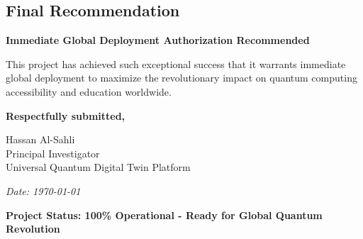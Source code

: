 \documentclass[12pt,a4paper]{article}
\begin{document}
\subsection{Final Recommendation}

\textbf{Immediate Global Deployment Authorization Recommended}

This project has achieved such exceptional success that it warrants immediate global deployment to maximize the revolutionary impact on quantum computing accessibility and education worldwide.

\vspace{1cm}

\textbf{Respectfully submitted,}

\vspace{0.5cm}

Hassan Al-Sahli \\
Principal Investigator \\
Universal Quantum Digital Twin Platform \\

\vspace{0.5cm}

\textit{Date: \today}

\vspace{0.5cm}

\textcolor{quantumblue}{\textbf{Project Status: 100\% Operational - Ready for Global Quantum Revolution}}
\end{document}
